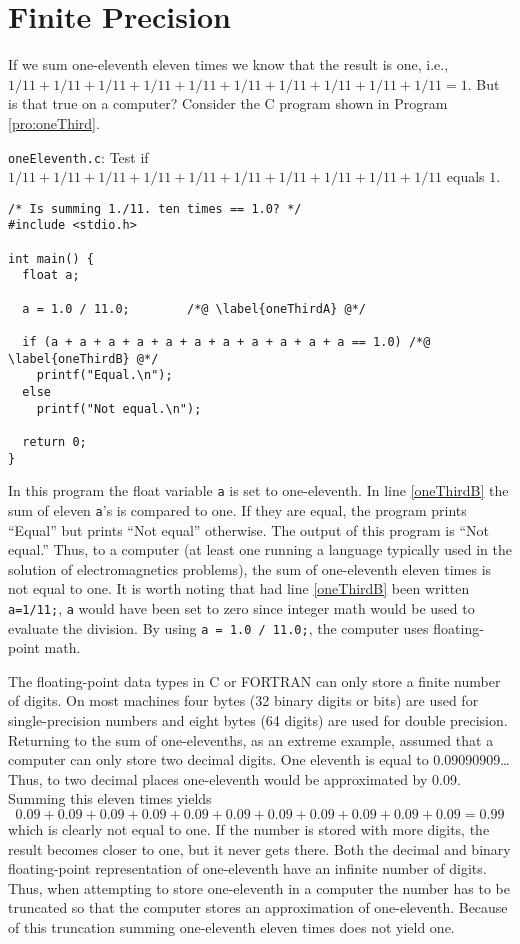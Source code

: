 \section{Finite Precision}

If we sum one-eleventh eleven times we know that the result is one,
i.e., $1/11+1/11+1/11+1/11+1/11+1/11+1/11+1/11+1/11+1/11=1$.  But is
that true on a computer?  Consider the C program shown in Program
\ref{pro:oneThird}.
\begin{program}
{\tt oneEleventh.c}: 
Test if $1/11+1/11+1/11+1/11+1/11+1/11+1/11+1/11+1/11+1/11$ equals $1$. \label{pro:oneThird}
\codemiddle
\begin{lstlisting}
/* Is summing 1./11. ten times == 1.0? */
#include <stdio.h>

int main() {
  float a;

  a = 1.0 / 11.0;        /*@ \label{oneThirdA} @*/

  if (a + a + a + a + a + a + a + a + a + a + a == 1.0) /*@ \label{oneThirdB} @*/
    printf("Equal.\n");
  else
    printf("Not equal.\n");

  return 0;
}
\end{lstlisting}
\end{program}
In this program the float variable {\tt a} is set to one-eleventh.  In
line \ref{oneThirdB} the sum of eleven {\tt a}'s is compared to one.
If they are equal, the program prints ``Equal'' but prints ``Not
equal'' otherwise.  The output of this program is ``Not equal.''
Thus, to a computer (at least one running a language typically used in
the solution of electromagnetics problems),
the sum of one-eleventh eleven times is not equal to
one.  It is worth noting that had line \ref{oneThirdB} been written
{\tt a=1/11;}, {\tt a} would have been set to zero since integer math
would be used to evaluate the division.  By using {\tt a = 1.0 /
  11.0;}, the computer uses floating-point math.

The floating-point data types in C or FORTRAN can only store a finite
number of digits.  On most machines four bytes (32 binary digits or
bits) are used for single-precision numbers and eight bytes (64
digits) are used for double precision.  Returning to the sum of
one-elevenths, as an extreme example, assumed that a computer can only
store two decimal digits.  One eleventh is equal to 0.09090909\ldots
Thus, to two decimal places one-eleventh would be approximated by
0.09.  Summing this eleven times yields
\[
0.09 + 0.09 + 0.09 + 0.09 + 0.09 + 0.09 + 0.09 + 0.09 + 0.09 + 0.09 +
0.09 = 0.99
\]
which is clearly not equal to one.  If the number is stored with more
digits, the result becomes closer to one, but it never gets there.
Both the decimal and binary floating-point representation of
one-eleventh have an infinite number of digits.  Thus, when attempting
to store one-eleventh in a computer the number has to be truncated so
that the computer stores an approximation of one-eleventh.  Because of
this truncation summing one-eleventh eleven times does not yield one.

